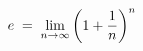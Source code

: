 \documentclass[preview]{standalone}
\begin{document}
\begin{align*}
\special{dvisvgm:raw <g id='unique000'>}e \;=\; \lim_{n \to \infty} \left(1 + \frac{1}{n}\right)^n\special{dvisvgm:raw </g>}
\end{align*}
\end{document}
